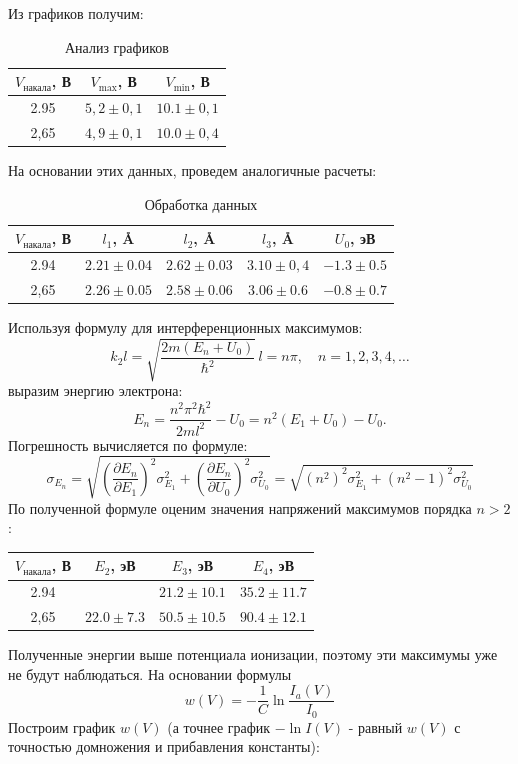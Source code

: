 \documentclass[a4paper,12pt]{extarticle}
\begin{document}
Из графиков получим:
\begin{table}[H]
    \centering
    \begin{tabular}{|c|c|c|}
        \hline
        $V_\text{накала}$, В & $V_{\text{max}}$, В & $V_{\text{min}}$, В \\ \hline
        2.95 & $5,2 \pm 0,1$ & $10.1 \pm 0,1$ \\ \hline
        2,65 & $4,9 \pm 0,1$ & $10.0 \pm 0,4$ \\ \hline
    \end{tabular}
    \caption{Анализ графиков}
\end{table}
На основании этих данных, проведем аналогичные расчеты:
\begin{table}[H]
\centering
{\begin{tabular}{|c|c|c|c|c|}
\hline
$V_\text{накала}$, В & $l_1$, \AA & $l_2$, \AA & $l_3$, \AA & $U_0$, эВ \\ \hline
2.94 & $2.21 \pm 0.04$ & $2.62 \pm 0.03$ & $3.10 \pm 0,4$ & $-1.3 \pm 0.5$ \\ \hline
2,65 & $2.26 \pm 0.05$ & $2.58 \pm 0.06$ & $3.06 \pm 0.6$ & $-0.8 \pm 0.7$ \\ \hline
\end{tabular}}
\caption{Обработка данных}
\end{table}
Используя формулу для интерференционных максимумов:
\[
k_2 l = \sqrt{\frac{2m(E_n + U_0)}{\hbar^2}} \, l = n\pi, \quad n = 1, 2, 3, 4, \dots
\]
выразим энергию электрона:
\[
E_n = \frac{n^2\pi^2\hbar^2}{2ml^2} - U_0 = n^2(E_1 + U_0) - U_0.
\]
Погрешность вычисляется по формуле:
\[
\sigma_{E_n} = \sqrt{\left(\frac{\partial E_n}{\partial E_1}\right)^2 \sigma_{E_1}^2 + \left(\frac{\partial E_n}{\partial U_0}\right)^2 \sigma_{U_0}^2}
= \sqrt{(n^2)^2 \sigma_{E_1}^2 + (n^2 - 1)^2 \sigma_{U_0}^2}
\]
По полученной формуле оценим значения напряжений максимумов порядка $n > 2$:
\begin{table}[H]
\centering
\begin{tabular}{|c|c|c|c|}
\hline
$V_{\text{накала}}$, В & $E_2$, эВ & $E_3$, эВ & $E_4$, эВ \\ \hline
2.94 & & $21.2 \pm 10.1$ & $35.2 \pm 11.7$ \\ \hline
2,65 & $22.0 \pm 7.3$ & $50.5 \pm 10.5$ & $90.4 \pm 12.1$ \\ \hline
\end{tabular}
\end{table}
Полученные энергии выше потенциала ионизации, поэтому эти максимумы уже не будут наблюдаться.
На основании формулы 
\begin{equation}
w(V) = -\frac{1}{C} \ln \frac{I_a(V)}{I_0}
\end{equation}
Построим график $w(V)$ (а точнее график $-\ln I(V)$ - равный $w(V)$ с точностью домножения и прибавления константы):
\end{document}
